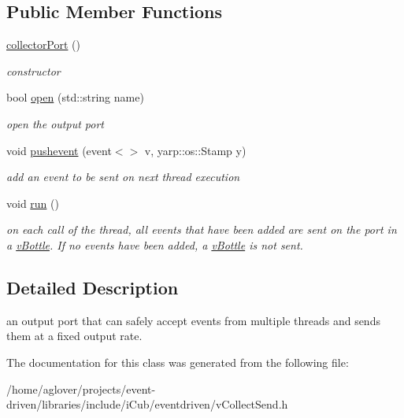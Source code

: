 \subsection*{Public Member Functions}
\begin{DoxyCompactItemize}
\item 
\hyperlink{classev_1_1collectorPort_ac7cd1de9c40bd46df66b67ae824bb258}{collector\+Port} ()\hypertarget{classev_1_1collectorPort_ac7cd1de9c40bd46df66b67ae824bb258}{}\label{classev_1_1collectorPort_ac7cd1de9c40bd46df66b67ae824bb258}

\begin{DoxyCompactList}\small\item\em constructor \end{DoxyCompactList}\item 
bool \hyperlink{classev_1_1collectorPort_a164072ae38c4e115873c451984b8e7f4}{open} (std\+::string name)\hypertarget{classev_1_1collectorPort_a164072ae38c4e115873c451984b8e7f4}{}\label{classev_1_1collectorPort_a164072ae38c4e115873c451984b8e7f4}

\begin{DoxyCompactList}\small\item\em open the output port \end{DoxyCompactList}\item 
void \hyperlink{classev_1_1collectorPort_ab1d587f6b728b65b22df73bbe674607d}{pushevent} (event$<$$>$ v, yarp\+::os\+::\+Stamp y)\hypertarget{classev_1_1collectorPort_ab1d587f6b728b65b22df73bbe674607d}{}\label{classev_1_1collectorPort_ab1d587f6b728b65b22df73bbe674607d}

\begin{DoxyCompactList}\small\item\em add an event to be sent on next thread execution \end{DoxyCompactList}\item 
void \hyperlink{classev_1_1collectorPort_a7ec227ae78ec71ca8867a20ae815ea7d}{run} ()\hypertarget{classev_1_1collectorPort_a7ec227ae78ec71ca8867a20ae815ea7d}{}\label{classev_1_1collectorPort_a7ec227ae78ec71ca8867a20ae815ea7d}

\begin{DoxyCompactList}\small\item\em on each call of the thread, all events that have been added are sent on the port in a \hyperlink{classev_1_1vBottle}{v\+Bottle}. If no events have been added, a \hyperlink{classev_1_1vBottle}{v\+Bottle} is not sent. \end{DoxyCompactList}\end{DoxyCompactItemize}


\subsection{Detailed Description}
an output port that can safely accept events from multiple threads and sends them at a fixed output rate. 

The documentation for this class was generated from the following file\+:\begin{DoxyCompactItemize}
\item 
/home/aglover/projects/event-\/driven/libraries/include/i\+Cub/eventdriven/v\+Collect\+Send.\+h\end{DoxyCompactItemize}
